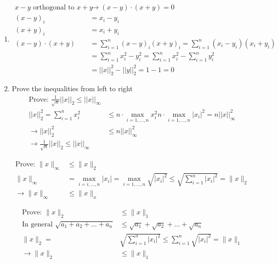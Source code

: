\documentclass[11pt]{article}
\begin{document}
\begin{solution}
\begin{enumerate}
\item
\begin{align*}
    x - y \text{ orthogonal to } x + y &\rightarrow (x-y) \cdot (x+y) = 0 \\
    (x-y)_i &= x_i - y_i \\
    (x+y)_i &= x_i + y_i \\
    (x-y) \cdot (x+y) &= \sum_{i=1}^n (x-y)_i (x+y)_i = \sum_{i=1}^n (x_i-y_i)(x_i+y_i) \\
    &= \sum_{i=1}^n x_i^2 - y_i^2 = \sum_{i=1}^n x_i^2 - \sum_{i=1}^n y_i^2 \\
    &= ||x||_2^2 - ||y||_2^2 = 1 - 1 = 0
\end{align*}

\item Prove the inequalities from left to right
\begin{align*}
    \text{Prove: } \frac{1}{\sqrt{n}} ||x||_2 \leq ||x||_{\infty} \\
    ||x||_2^2 = \sum_{i=1}^n x_i^2 &\leq n \cdot \max_{i=1,\dots,n} x_i^2 n \cdot \max_{i=1,\dots,n} |x_i|^2 = n ||x||_{\infty}^2 \\
    \rightarrow ||x||_2^2 &\leq n ||x||_{\infty}^2 \\
    \rightarrow \frac{1}{\sqrt{n}} ||x||_2 \leq ||x||_{\infty}
\end{align*}

\begin{align*}
    \text{Prove: } \|x\|_{\infty} &\leq \|x\|_2 \\
    \|x\|_{\infty} &= \max_{i=i,\dots,n} |x_i| = \max_{i=1,\dots,n} \sqrt{|x_i|^2} \leq \sqrt{\sum_{i=1}^n |x_i|^2} = \|x\|_2 \\
    \rightarrow \|x\|_{\infty} &\leq \|x\|_x
\end{align*}

\begin{align*}
    \text{Prove: } \|x\|_2 &\leq \|x\|_1 \\
    \text{In general } \sqrt{a_1 + a_2 + \dots + a_n} &\leq \sqrt{a_1} + \sqrt{a_2} + \dots + \sqrt{a_n} \\
    \|x\|_2 = &\sqrt{\sum_{i=1}^n |x_i|^2} \leq \sum_{i=1}^n \sqrt{|x_i|^2} = \|x\|_1 \\
    \rightarrow \|x\|_2 &\leq \|x\|_1
\end{align*}


\end{enumerate}
\end{solution}
\end{document}
